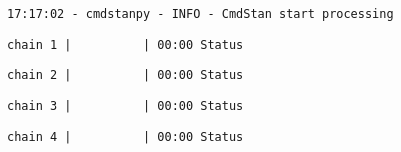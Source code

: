 \documentclass[11pt]{article}
\begin{document}
    \begin{Verbatim}[commandchars=\\\{\}]
17:17:02 - cmdstanpy - INFO - CmdStan start processing
    \end{Verbatim}

    
    \begin{Verbatim}[commandchars=\\\{\}]
chain 1 |          | 00:00 Status
    \end{Verbatim}

    
    
    \begin{Verbatim}[commandchars=\\\{\}]
chain 2 |          | 00:00 Status
    \end{Verbatim}

    
    
    \begin{Verbatim}[commandchars=\\\{\}]
chain 3 |          | 00:00 Status
    \end{Verbatim}

    
    
    \begin{Verbatim}[commandchars=\\\{\}]
chain 4 |          | 00:00 Status
    \end{Verbatim}

    
    \begin{Verbatim}[commandchars=\\\{\}]

    \end{Verbatim}
\end{document}
